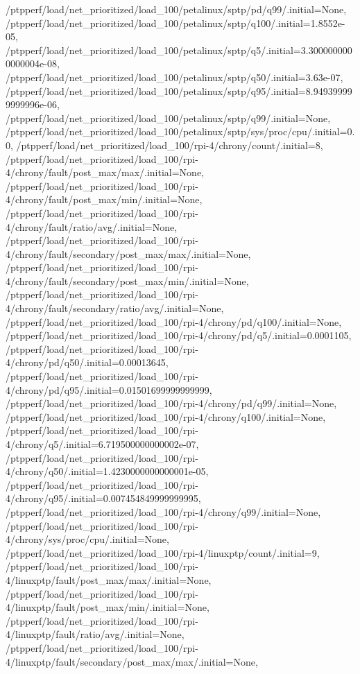 {    /ptpperf/load/net_prioritized/load_100/petalinux/sptp/pd/q99/.initial=None,
    /ptpperf/load/net_prioritized/load_100/petalinux/sptp/q100/.initial=1.8552e-05,
    /ptpperf/load/net_prioritized/load_100/petalinux/sptp/q5/.initial=3.3000000000000004e-08,
    /ptpperf/load/net_prioritized/load_100/petalinux/sptp/q50/.initial=3.63e-07,
    /ptpperf/load/net_prioritized/load_100/petalinux/sptp/q95/.initial=8.949399999999996e-06,
    /ptpperf/load/net_prioritized/load_100/petalinux/sptp/q99/.initial=None,
    /ptpperf/load/net_prioritized/load_100/petalinux/sptp/sys/proc/cpu/.initial=0.0,
    /ptpperf/load/net_prioritized/load_100/rpi-4/chrony/count/.initial=8,
    /ptpperf/load/net_prioritized/load_100/rpi-4/chrony/fault/post_max/max/.initial=None,
    /ptpperf/load/net_prioritized/load_100/rpi-4/chrony/fault/post_max/min/.initial=None,
    /ptpperf/load/net_prioritized/load_100/rpi-4/chrony/fault/ratio/avg/.initial=None,
    /ptpperf/load/net_prioritized/load_100/rpi-4/chrony/fault/secondary/post_max/max/.initial=None,
    /ptpperf/load/net_prioritized/load_100/rpi-4/chrony/fault/secondary/post_max/min/.initial=None,
    /ptpperf/load/net_prioritized/load_100/rpi-4/chrony/fault/secondary/ratio/avg/.initial=None,
    /ptpperf/load/net_prioritized/load_100/rpi-4/chrony/pd/q100/.initial=None,
    /ptpperf/load/net_prioritized/load_100/rpi-4/chrony/pd/q5/.initial=0.0001105,
    /ptpperf/load/net_prioritized/load_100/rpi-4/chrony/pd/q50/.initial=0.00013645,
    /ptpperf/load/net_prioritized/load_100/rpi-4/chrony/pd/q95/.initial=0.01501699999999999,
    /ptpperf/load/net_prioritized/load_100/rpi-4/chrony/pd/q99/.initial=None,
    /ptpperf/load/net_prioritized/load_100/rpi-4/chrony/q100/.initial=None,
    /ptpperf/load/net_prioritized/load_100/rpi-4/chrony/q5/.initial=6.719500000000002e-07,
    /ptpperf/load/net_prioritized/load_100/rpi-4/chrony/q50/.initial=1.4230000000000001e-05,
    /ptpperf/load/net_prioritized/load_100/rpi-4/chrony/q95/.initial=0.007454849999999995,
    /ptpperf/load/net_prioritized/load_100/rpi-4/chrony/q99/.initial=None,
    /ptpperf/load/net_prioritized/load_100/rpi-4/chrony/sys/proc/cpu/.initial=None,
    /ptpperf/load/net_prioritized/load_100/rpi-4/linuxptp/count/.initial=9,
    /ptpperf/load/net_prioritized/load_100/rpi-4/linuxptp/fault/post_max/max/.initial=None,
    /ptpperf/load/net_prioritized/load_100/rpi-4/linuxptp/fault/post_max/min/.initial=None,
    /ptpperf/load/net_prioritized/load_100/rpi-4/linuxptp/fault/ratio/avg/.initial=None,
    /ptpperf/load/net_prioritized/load_100/rpi-4/linuxptp/fault/secondary/post_max/max/.initial=None,
}
